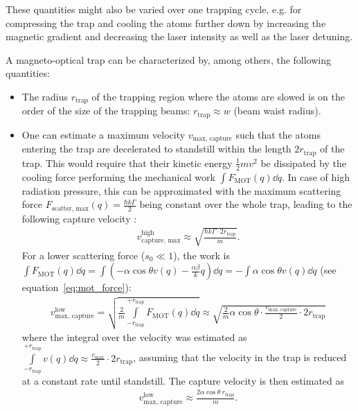 These quantities might also be varied over one trapping cycle, e.g. for compressing the trap and cooling the atoms further down by increasing the magnetic gradient and decreasing the laser intensity as well as the laser detuning.

A magneto-optical trap can be characterized by, among others, the following quantities:
\begin{itemize}
    \item The radius $r_\text{trap}$ of the trapping region where the atoms are slowed  is on the order of the size of the trapping beams: $r_\text{trap} \approx w$ (beam waist radius).
    \item One can estimate a maximum velocity $v_\text{max, capture}$ such that the atoms entering the trap are decelerated to standstill within the length $2r_\text{trap}$ of the trap. This would require that their kinetic energy $\frac{1}{2}mv^2$ be dissipated by the cooling force performing the mechanical work $\int F_\text{MOT}(q) \dd{q}$. In case of high radiation pressure, this can be approximated with the maximum scattering force $F_\text{scatter, max}(q) = \frac{\hbar k \Gamma}{2}$ being constant over the whole trap, leading to the following capture velocity \cite{lunden_enhancing_2020}:
    \begin{align}\label{eq:capture_velocity_high}
        v_\text{capture, max}^\text{high} \approx \sqrt{\frac{\hbar k \Gamma \cdot 2 r_\text{trap}}{m}}.
    \end{align}
     For a lower scattering force ($s_0 \ll 1$), the work is $\int F_\text{MOT}(q)\dd{q}= \int (-\alpha \cos \theta v(q) - \frac{\alpha\beta}{k}q) \dd{q} = - \int \alpha \cos \theta v(q) \dd{q}$ (see equation~\ref{eq:mot_force}):
    \begin{align}
            v_\text{max, capture}^\text{low}
            = \sqrt{\frac{2}{m} \int\limits_{-r_\text{trap}}^{+r_\text{trap}} F_\text{MOT}(q) \dd{q}} 
            \approx \sqrt{\frac{2}{m} \alpha \cos \theta \cdot \frac{v_\text{max, capture}}{2} \cdot 2r_\text{trap}}
    \end{align}
    where the integral over the velocity was estimated as $\int\limits_{-r_\text{trap}}^{+r_\text{trap}}  v(q) \dd{q} \approx \frac{v_\text{max}}{2} \cdot 2r_\text{trap}$, assuming that the velocity in the trap is reduced at a constant rate until standstill. The capture velocity is then estimated as
    \begin{align}\label{eq:capture_velocity_low}
        v_\text{max, capture}^\text{low} \approx \frac{2 \alpha \cos \theta ~ r_\text{trap}}{m}.

\end{align}
\end{itemize}
